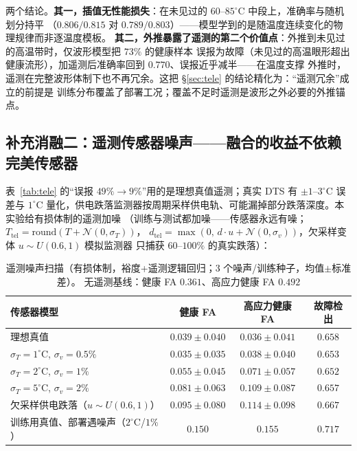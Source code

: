 \documentclass[11pt,a4paper,fontset=mac]{ctexart}
\begin{document}
两个结论。\textbf{其一，插值无性能损失}：在未见过的 $60$--$85^\circ$C 中段上，准确率与随机划分持平
（$0.806/0.815$ 对 $0.789/0.803$）——模型学到的是随温度连续变化的物理规律而非逐温度模板。
\textbf{其二，外推暴露了遥测的第二个价值点}：外推到未见过的高温带时，仅波形模型把 $73\%$ 的健康样本
误报为故障（未见过的高温眼形超出健康流形），加遥测后准确率回到 $0.770$、误报近乎减半——在温度支撑
外推时，遥测在完整波形体制下也不再冗余。这把 \S\ref{sec:tele} 的结论精化为：“遥测冗余”成立的前提是
训练分布覆盖了部署工况；覆盖不足时遥测是波形之外必要的外推锚点。

\subsection{补充消融二：遥测传感器噪声——融合的收益不依赖完美传感器}\label{sec:telnoise}
表~\ref{tab:tele} 的“误报 $49\%\to9\%$”用的是理想真值遥测；真实 DTS 有 $\pm1$--$3^\circ$C 误差与
$1^\circ$C 量化，供电跌落监测器按周期采样供电轨、可能漏掉部分跌落深度。本实验给有损体制的遥测加噪
（训练与测试都加噪——传感器永远有噪；$T_\text{tel}=\mathrm{round}(T+\mathcal N(0,\sigma_T))$，
$d_\text{tel}=\max(0,\,d\cdot u+\mathcal N(0,\sigma_v))$，欠采样变体 $u\sim U(0.6,1)$ 模拟监测器
只捕获 $60$--$100\%$ 的真实跌落）：

\begin{table}[h]\centering\small
\caption{遥测噪声扫描（有损体制，裕度+遥测逻辑回归；3 个噪声/训练种子，均值$\pm$标准差）。
无遥测基线：健康 FA $0.361$、高应力健康 FA $0.492$}\label{tab:telnoise}
\begin{tabular}{@{}lccc@{}}
\toprule
传感器模型 & 健康 FA & 高应力健康 FA & 故障检出 \\
\midrule
理想真值 & $0.039\pm0.040$ & $0.036\pm0.041$ & $0.658$ \\
$\sigma_T{=}1^\circ$C, $\sigma_v{=}0.5\%$ & $0.035\pm0.035$ & $0.038\pm0.040$ & $0.653$ \\
$\sigma_T{=}2^\circ$C, $\sigma_v{=}1\%$ & $0.055\pm0.045$ & $0.071\pm0.057$ & $0.652$ \\
$\sigma_T{=}5^\circ$C, $\sigma_v{=}2\%$ & $0.081\pm0.063$ & $0.109\pm0.087$ & $0.657$ \\
欠采样供电跌落（$u\sim U(0.6,1)$） & $0.095\pm0.080$ & $0.114\pm0.098$ & $0.667$ \\
\midrule
训练用真值、部署遇噪声（$2^\circ$C/$1\%$） & $0.150$ & $0.155$ & $0.717$ \\
\bottomrule
\end{tabular}
\end{table}
\end{document}
